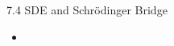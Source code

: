 \begin{frame}{7.4 SDE and Schrödinger Bridge}
    \begin{itemize}
        \item
    \end{itemize}
\end{frame}
